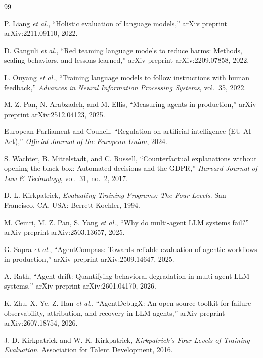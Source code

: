 \documentclass[conference]{IEEEtran}
\begin{document}
\begin{thebibliography}{99}
\footnotesize

P. Liang \emph{et al.}, ``Holistic evaluation of language models,'' arXiv
preprint arXiv:2211.09110, 2022.

D. Ganguli \emph{et al.}, ``Red teaming language models to reduce harms:
Methods, scaling behaviors, and lessons learned,'' arXiv preprint
arXiv:2209.07858, 2022.

L. Ouyang \emph{et al.}, ``Training language models to follow instructions with
human feedback,'' \emph{Advances in Neural Information Processing Systems},
vol.~35, 2022.

M. Z. Pan, N. Arabzadeh, and M. Ellis, ``Measuring agents in production,'' arXiv
preprint arXiv:2512.04123, 2025.

European Parliament and Council, ``Regulation on artificial intelligence (EU AI
Act),'' \emph{Official Journal of the European Union}, 2024.

S. Wachter, B. Mittelstadt, and C. Russell, ``Counterfactual explanations
without opening the black box: Automated decisions and the GDPR,'' \emph{Harvard
Journal of Law \& Technology}, vol.~31, no.~2, 2017.

D. L. Kirkpatrick, \emph{Evaluating Training Programs: The Four Levels}. San
Francisco, CA, USA: Berrett-Koehler, 1994.

M. Cemri, M. Z. Pan, S. Yang \emph{et al.}, ``Why do multi-agent LLM systems
fail?'' arXiv preprint arXiv:2503.13657, 2025.

G. Sapra \emph{et al.}, ``AgentCompass: Towards reliable evaluation of agentic
workflows in production,'' arXiv preprint arXiv:2509.14647, 2025.

A. Rath, ``Agent drift: Quantifying behavioral degradation in multi-agent LLM
systems,'' arXiv preprint arXiv:2601.04170, 2026.

K. Zhu, X. Ye, Z. Han \emph{et al.}, ``AgentDebugX: An open-source toolkit for
failure observability, attribution, and recovery in LLM agents,'' arXiv
preprint arXiv:2607.18754, 2026.

J. D. Kirkpatrick and W. K. Kirkpatrick, \emph{Kirkpatrick's Four Levels of
Training Evaluation}. Association for Talent Development, 2016.


\end{thebibliography}
\end{document}
